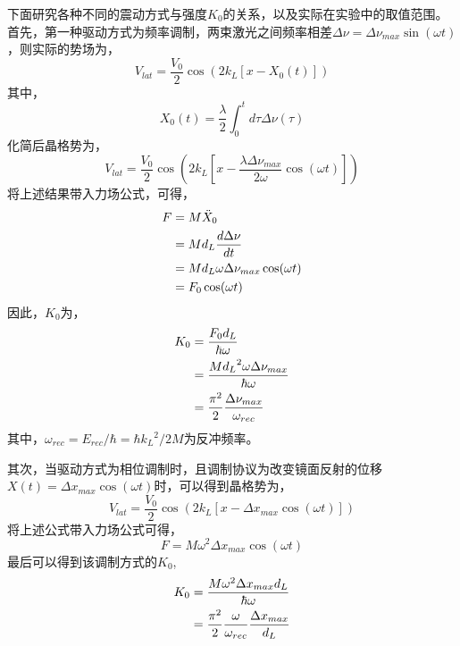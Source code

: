 \documentclass{article}
\begin{document}
	

	下面研究各种不同的震动方式与强度$K_0$的关系，以及实际在实验中的取值范围。
	首先，第一种驱动方式为频率调制，两束激光之间频率相差$\Delta \nu = \Delta \nu_{max} \sin(\omega t)$，则实际的势场为，
	\begin{equation}
		V_{lat} = \frac{V_0}{2} \cos(2k_L \left[ x - X_0(t) \right])
	\end{equation}
	其中，
	\begin{equation}
		X_0(t) = \frac{\lambda}{2} \int_0^t d \tau \Delta \nu(\tau)
	\end{equation}
	化简后晶格势为，
	\begin{equation}
		V_{lat} = \frac{V_0}{2} \cos \left( 2k_L \left[ x - \frac{\lambda \Delta \nu_{max}}{2\omega} \cos(\omega t) \right] \right)
	\end{equation}
	将上述结果带入力场公式，可得，
	\begin{align}
		F &= M \ddot{X}_0  \notag \\
		  &= M d_L\frac{d \Delta \nu}{dt} \notag \\
		  &= M d_L \omega \Delta \nu_{max} \cos(\omega t) \notag \\
		  &= F_0 \cos(\omega t)
	\end{align}
	因此，$K_0$为，
	\begin{align}
		K_0 &= \frac{F_0d_L}{\hbar \omega} \notag \\
			&= \frac{M {d_L}^2 \omega \Delta \nu_{max}}{\hbar \omega} \notag \\
			&= \frac{\pi^2}{2} \frac{\Delta \nu_{max}}{\omega_{rec}}
	\end{align}
	其中，$\omega_{rec} = E_{rec}/\hbar = \hbar {k_L}^2 / 2M$为反冲频率。
	
	其次，当驱动方式为相位调制时，且调制协议为改变镜面反射的位移$X(t) = \Delta x_{max} \cos(\omega t)$时，可以得到晶格势为，
	\begin{equation}
		V_{lat} = \frac{V_0}{2} \cos(2k_L \left[ x - \Delta x_{max} \cos(\omega t) \right])
	\end{equation}
	将上述公式带入力场公式可得，
	\begin{equation}
		F = M \omega^2 \Delta x_{max} \cos(\omega t)
	\end{equation}
	最后可以得到该调制方式的$K_0$,
	\begin{align}
		K_0 &= \frac{ M \omega^2 \Delta x_{max} d_L}{\hbar \omega} \notag \\
			&= \frac{\pi^2}{2} \frac{\omega}{\omega_{rec}} \frac{\Delta x_{max}}{d_L}
	\end{align}
	 
\end{document}
